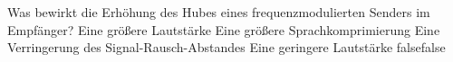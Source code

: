     {Was bewirkt die Erhöhung des Hubes eines frequenzmodulierten Senders im Empfänger?}
    {Eine größere Lautstärke}
    {Eine größere Sprachkomprimierung}
    {Eine Verringerung des Signal-Rausch-Abstandes}
    {Eine geringere Lautstärke}
    {false}{false}